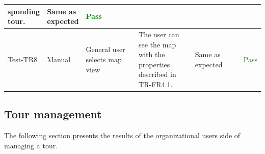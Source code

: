 \documentclass[12pt, titlepage]{article}
\begin{document}
\begin{table}[H]
{\begin{tabular}{|l|p{0.15\linewidth}|p{0.3\linewidth}|p{0.3\linewidth}|p{0.3\linewidth}|p{0.1\linewidth}|}
sponding tour.                        & Same as expected                             & \textcolor{Green}{Pass}               \\
      \hline
      Test-TR8                           & Manual                            & General user selects map view & The user can see the map with the properties described in
TR-FR4.1.                        & Same as expected                             & \textcolor{Green}{Pass}               \\
      \hline
    \end{tabular}}
\label{table:GR6}
\end{table}

\subsection{Tour management}
The following section presents the results of the organizational users side of managing a tour.
\end{document}
